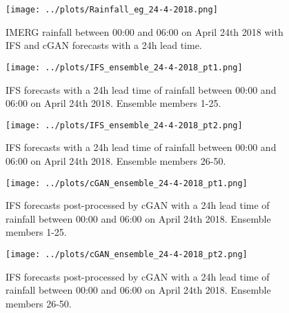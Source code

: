 \documentclass[12pt]{article}
\begin{document}

\begin{figure}
\begin{center}
\texttt{[image: ../plots/Rainfall\_eg\_24-4-2018.png]}
\end{center}
\caption{IMERG rainfall between 00:00 and 06:00 on April 24th 2018 with IFS and cGAN forecasts with a 24h lead time.}
\end{figure}

\begin{figure}
\begin{center}
\texttt{[image: ../plots/IFS\_ensemble\_24-4-2018\_pt1.png]}
\end{center}
\caption{IFS forecasts with a 24h lead time of rainfall between 00:00 and 06:00 on April 24th 2018. Ensemble members 1-25.}
\end{figure}

\begin{figure}
\begin{center}
\texttt{[image: ../plots/IFS\_ensemble\_24-4-2018\_pt2.png]}
\end{center}
\caption{IFS forecasts with a 24h lead time of rainfall between 00:00 and 06:00 on April 24th 2018. Ensemble members 26-50.}
\end{figure}

\begin{figure}
\begin{center}
\texttt{[image: ../plots/cGAN\_ensemble\_24-4-2018\_pt1.png]}
\end{center}
\caption{IFS forecasts post-processed by cGAN with a 24h lead time of rainfall between 00:00 and 06:00 on April 24th 2018. Ensemble members 1-25.}
\end{figure}

\begin{figure}
\begin{center}
\texttt{[image: ../plots/cGAN\_ensemble\_24-4-2018\_pt2.png]}
\end{center}
\caption{IFS forecasts post-processed by cGAN with a 24h lead time of rainfall between 00:00 and 06:00 on April 24th 2018. Ensemble members 26-50.}
\end{figure}
\end{document}
